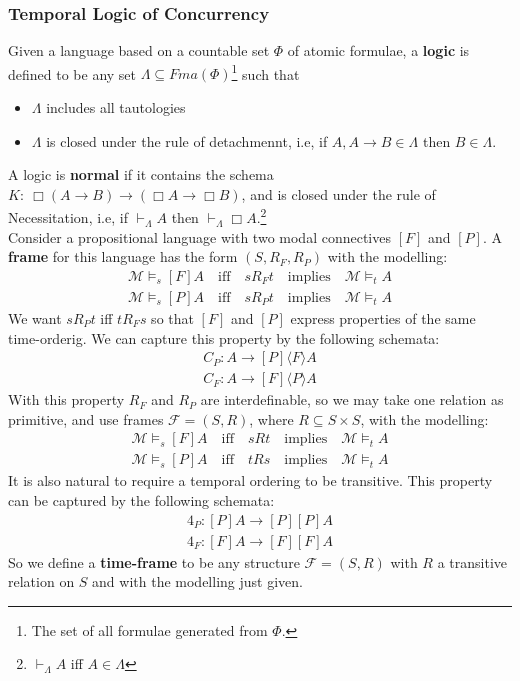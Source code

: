 \documentclass{article}
\begin{document}
\subsubsection{Temporal Logic of Concurrency}
Given a language based on a countable set $\Phi$ of atomic formulae, a \textbf{logic} is defined to be any set $\Lambda\subseteq Fma(\Phi)$\footnote{The set of all formulae generated from $\Phi$.} such that

\vspace{-2mm}
\begin{itemize}
	\itemsep-.3em
	\item $\Lambda$ includes all tautologies
	\item $\Lambda$ is closed under the rule of detachmennt, i.e, if $A,A\rightarrow B\in\Lambda$ then $B\in \Lambda$.
\end{itemize}

A logic is \textbf{normal} if it contains the schema $K:\ \Box(A\rightarrow B)\rightarrow(\Box A\rightarrow\Box B)$, and is closed under the rule of Necessitation, i.e, if
$\vdash_\Lambda A$ then $\vdash_\Lambda\Box A$.\footnote{$\vdash_\Lambda A$ iff $A\in \Lambda$}\\

Consider a propositional language with two modal connectives $[F]$ and $[P]$. A \textbf{frame} for this language has the form $(S,R_F,R_P)$ with the modelling:
\begin{align*}
\mathcal{M}\vDash_s[F]A \quad \text{iff} \quad sR_Ft \quad \text{implies} \quad \mathcal{M}\vDash_tA\\
\mathcal{M}\vDash_s[P]A \quad \text{iff} \quad sR_Pt \quad \text{implies} \quad \mathcal{M}\vDash_tA
\end{align*}
We want $sR_Pt$ iff $tR_Fs$ so that $[F]$ and $[P]$ express properties of the same time-orderig. We can capture this property by the following schemata:
\begin{align*}
C_P:A\rightarrow[P]\langle F\rangle A\\
C_F:A\rightarrow[F]\langle P\rangle A
\end{align*}
With this property $R_F$ and $R_P$ are interdefinable, so we may take one relation as primitive, and use frames $\mathcal{F}=(S,R)$, where $R\subseteq S\times S$, with the modelling:
\begin{align*}
\mathcal{M}\vDash_s[F]A \quad \text{iff} \quad sRt \quad \text{implies} \quad \mathcal{M}\vDash_tA\\
\mathcal{M}\vDash_s[P]A \quad \text{iff} \quad tRs \quad \text{implies} \quad \mathcal{M}\vDash_tA
\end{align*}
It is also natural to require a temporal ordering to be transitive. This property can be captured by the following schemata:
\begin{align*}
4_P:[P]A\rightarrow[P][P]A\\
4_F:[F]A\rightarrow[F][F]A
\end{align*}
So we define a \textbf{time-frame} to be any structure $\mathcal{F}=(S,R)$ with $R$ a transitive relation on $S$ and with the modelling just given.\\
\end{document}
